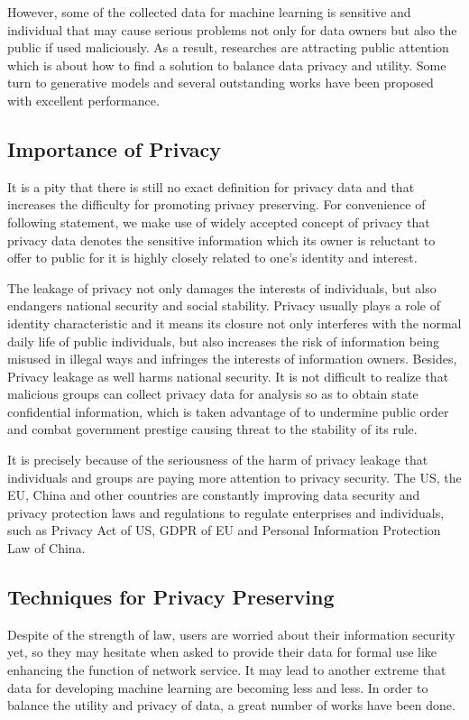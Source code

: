 \documentclass[conference]{IEEEtran}
\begin{document}
However, some of the collected data for machine learning is sensitive and individual that may cause serious problems not only for data owners but also the public if used maliciously. As a result, researches are attracting public attention which is about how to find a solution to balance data privacy and utility. Some turn to generative models and several outstanding works have been proposed with excellent performance.

\subsection{Importance of Privacy}
It is a pity that there is still no exact definition for privacy data and that increases the difficulty for promoting privacy preserving. For convenience of following statement, we make use of widely accepted concept of privacy that privacy data denotes the sensitive information which its owner is reluctant to offer to public for it is highly closely related to one's identity and interest.

The leakage of privacy not only damages the interests of individuals, but also endangers national security and social stability. Privacy usually plays a role of identity characteristic and it means its closure not only interferes with the normal daily life of public individuals, but also increases the risk of information being misused in illegal ways and infringes the interests of information owners. Besides, Privacy leakage as well harms national security. It is not difficult to realize that malicious groups can collect privacy data for analysis so as to obtain state confidential information, which is taken advantage of to undermine public order and combat government prestige causing threat to the stability of its rule.

It is precisely because of the seriousness of the harm of privacy leakage that individuals and groups are paying more attention to privacy security. The US, the EU, China and other countries are constantly improving data security and privacy protection laws and regulations to regulate enterprises and individuals, such as Privacy Act of US, GDPR of EU and Personal Information Protection Law of China.

\subsection{Techniques for Privacy Preserving}
Despite of the strength of law, users are worried about their information security yet, so they may hesitate when asked to provide their data for formal use like enhancing the function of network service. It may lead to another extreme that data for developing machine learning are becoming less and less. In order to balance the utility and privacy of data, a great number of works have been done.\cite{b1}
\end{document}
